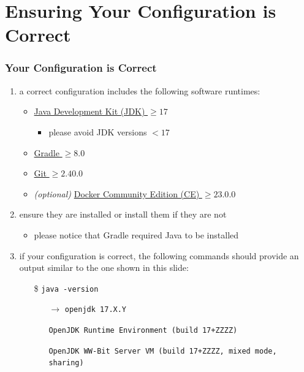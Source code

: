 \documentclass[presentation]{beamer}\mode<presentation>{\usetheme{AMSBolognaFC}}
\begin{document}
\section{Ensuring Your Configuration is Correct}

\begin{frame}[c,allowframebreaks]
\frametitle{Your Configuration is Correct}

    \begin{enumerate}

    \item a correct configuration includes the following software runtimes:
    \begin{itemize}
        \item \href{https://www.oracle.com/java/technologies/downloads/}{Java Development Kit (JDK) $\geq 17$}
        \begin{itemize}
            \item \alert{please avoid JDK versions $< 17$}
        \end{itemize}
        \item \href{https://gradle.org/releases}{Gradle $\geq 8.0$}
        \item \href{https://git-scm.com}{Git $\geq 2.40.0$}
        \item \emph{(optional)} \href{https://www.docker.com/products/docker-desktop}{Docker Community Edition (CE) $\geq 23.0.0$}
    \end{itemize}

    \item ensure they are installed or install them if they are not
    \begin{itemize}
        \item please notice that Gradle required Java to be installed
    \end{itemize}

    \framebreak

    \item if your configuration is correct, the following commands should provide an output similar to the one shown in this slide:
    \begin{itemize}
        \item[\$] \texttt{java -version}
        \begin{itemize}
            \item[$\rightarrow$] \texttt{openjdk 17.X.Y}
            \item[] \texttt{OpenJDK Runtime Environment (build 17+ZZZZ)}
            \item[] \texttt{OpenJDK WW-Bit Server VM (build 17+ZZZZ, mixed mode, sharing)}
        \end{itemize}


\end{itemize}
\end{enumerate}
\end{frame}
\end{document}
